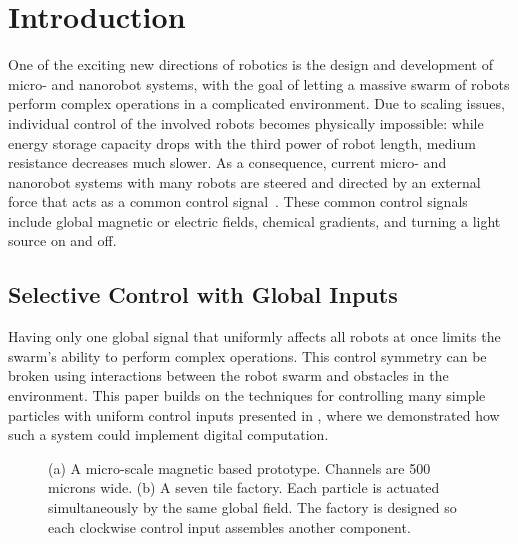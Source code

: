 \section{Introduction}\label{sec:Intro}

One of the exciting new directions of robotics is the design and development
of micro- and nanorobot systems, with the goal of letting a massive swarm of robots
perform complex operations in a complicated environment. Due to scaling 
issues, individual control of the involved robots becomes physically impossible:
while energy storage capacity drops with the third power of robot length,
medium resistance decreases much slower. As a consequence,
current micro- and nanorobot systems with many robots are steered and
directed by an external force that acts as a common control signal~\cite{Donald2013,Chiang2011,Hsi-Wen2012,Diller2013,Jing2013,Ou2013,Lanauze2013}.
These common control signals include global magnetic or electric fields,
chemical gradients, and turning a light source on and off.  

 \subsection{Selective Control with Global Inputs}
Having only one global signal that uniformly affects all robots at once
limits the swarm's ability to perform complex operations.
This control symmetry can be broken using interactions between the robot swarm
and obstacles in the environment. 
This paper builds on the techniques for controlling many simple particles with uniform control inputs presented in \cite{Becker2013f,Becker2014,Becker2014a}, where
we demonstrated how such a system could  implement digital computation.


\begin{figure}
\centering
{} 
\label{fig:fig1}
\newline
{}
\label{fig:fig2}
\caption{(a) A micro-scale magnetic based prototype. Channels are 500 microns wide.
 (b) A seven tile factory. Each particle is actuated simultaneously by the same global field. The factory is designed so each clockwise control input assembles another component.}
\label{fig:1} 
\end{figure}



